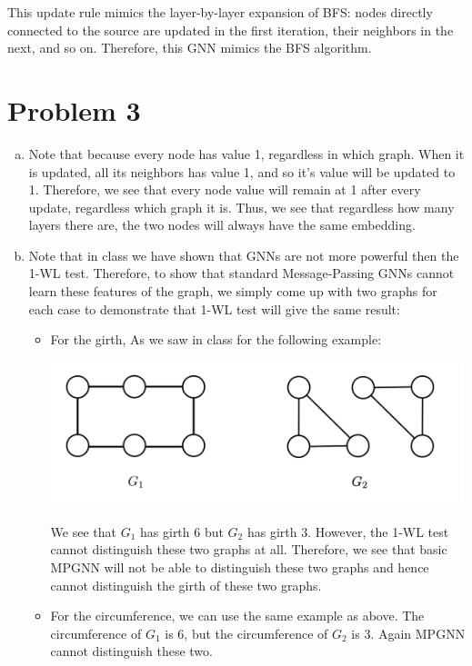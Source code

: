 \documentclass[11pt]{scrartcl}
\begin{document}
This update rule mimics the layer-by-layer expansion of BFS: nodes directly connected to the source are updated in the first iteration, their neighbors in the next, and so on. Therefore, this GNN mimics the BFS algorithm.

\newpage

\section{Problem 3}

\begin{enumerate}[(a)]
    \item Note that because every node has value 1, regardless in which graph. When it is updated, all its neighbors has value 1, and so it's value will be updated to 1. Therefore, we see that every node value will remain at 1 after every update, regardless which graph it is. Thus, we see that regardless how many layers there are, the two nodes will always have the same embedding.
    \item Note that in class we have shown that GNNs are not more powerful then the 1-WL test. Therefore, to show that standard Message-Passing GNNs cannot learn these features of the graph, we simply come up with two graphs for each case to demonstrate that 1-WL test will give the same result: \begin{itemize}
        \item For the girth, As we saw in class for the following example: \begin{center}
            \includegraphics[width=12cm]{hw2-img/hw2-p3-b1.png}
        \end{center}
        We see that $G_1$ has girth 6 but $G_2$ has girth 3. However, the 1-WL test cannot distinguish these two graphs at all. Therefore, we see that basic MPGNN will not be able to distinguish these two graphs and hence cannot distinguish the girth of these two graphs.
        \item For the circumference, we can use the same example as above. The circumference of $G_1$ is 6, but the circumference of $G_2$ is 3. Again MPGNN cannot distinguish these two.

\end{itemize}
\end{enumerate}
\end{document}
